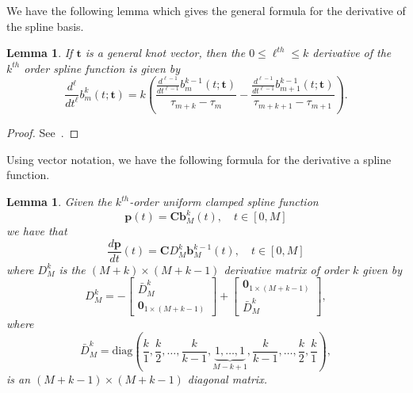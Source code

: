 \documentclass{article}
\newtheorem{lemma}[theorem]{Lemma}
\newcommand{\bbf}{\mathbf{b}}
\newcommand{\Cbf}{\mathbf{C}}
\begin{document}
We have the following lemma which gives the general formula for the derivative of the spline basis.
\begin{lemma}\label{lem:derivative_basis_functions}
If $\mathbf{t}$ is a general knot vector, then the $0\leq \ell^{th} \leq k$ derivative of the $k^{th}$ order spline function is given by
\[
\frac{d^\ell}{dt^\ell}b_m^k(t; \mathbf{t}) = k\left(\frac{\frac{d^{\ell-1}}{dt^{\ell-1}}b_m^{k-1}(t; \mathbf{t})}{\tau_{m+k}-\tau_m} - \frac{\frac{d^{\ell-1}}{dt^{\ell-1}}b_{m+1}^{k-1}(t; \mathbf{t})}{\tau_{m+k+1}-\tau_{m+1}} \right).
\]	
\end{lemma}
\begin{proof}
See~\cite{PieglTiller95}.
\end{proof}

Using vector notation, we have the following formula for the derivative a spline function.
\begin{lemma} \label{lem:derivative_of_spline}
Given the $k^{th}$-order uniform clamped spline function
\[
\mathbf{p}(t) = \Cbf \bbf_M^k(t), \quad t\in[0, M]
\]
we have that
\[
\frac{d\mathbf{p}}{dt}(t) = \Cbf D_M^k \bbf_M^{k-1}(t), \quad t\in[0, M]
\]	
where $D_M^k$ is the $(M+k)\times (M+k-1)$ derivative matrix of order $k$ given by
\begin{equation}\label{eq:D_k}
D_M^k = -\begin{bmatrix}\bar{D}_M^k \\ \mathbf{0}_{1\times(M+k-1)} \end{bmatrix} + \begin{bmatrix}\mathbf{0}_{1\times(M+k-1)} \\ \bar{D}_M^k \end{bmatrix},
\end{equation}
where
\begin{equation}\label{eq:D_k_bar}
\bar{D}_M^k = \text{diag}\left(\frac{k}{1}, \frac{k}{2}, \dots, \frac{k}{k-1}, \underbrace{1, \dots, 1}_{M-k+1}, \frac{k}{k-1}, \dots, \frac{k}{2}, \frac{k}{1}\right),
\end{equation}
is an $(M+k-1)\times(M+k-1)$ diagonal matrix.
\end{lemma}
\end{document}
